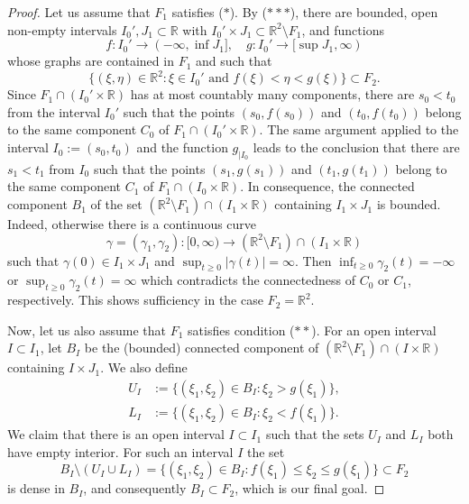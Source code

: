 \documentclass[a4paper,10pt]{amsart}
\newtheorem*{crucial lemma}{Lemma \ref{lem:nice polynomial2}}
\theoremstyle{definition}
\newcommand{\R}{\mathbb{R}}
\begin{document}
\begin{proof}
Let us assume that $F_1$ satisfies ($\ast$). By ($\ast\ast\ast$), there are bounded, open non-empty intervals $I_0',J_1\subset \R$ with $I_0'\times J_1\subset \R^2\setminus F_1$, and functions 
\[f\colon I_0'\to(-\infty,\inf J_1],\quad g\colon I_0'\to[\sup J_1,\infty)\] whose graphs are contained in $F_1$ and such that
\[\{(\xi,\eta)\in\R^2\colon \xi\in I_0' \text{ and } f(\xi)<\eta<g(\xi)\}\subset F_2.\]
Since $F_1\cap(I_0'\times \R)$ has at most countably many components, there are $s_0<t_0$ from the interval $I_0'$ such that the points $(s_0,f(s_0))$ and $(t_0,f(t_0))$ belong to the same component $C_0$ of $F_1\cap(I_0'\times \R)$. The same argument applied to the interval $I_0:=(s_0,t_0)$ and the function $g_{\mid{I_0}}$ leads to the conclusion that there are $s_1<t_1$ from $I_0$ such that the points $(s_1,g(s_1))$ and $(t_1,g(t_1))$ belong to the same component $C_1$ of $F_1\cap(I_0\times\R)$. In consequence, the connected component $B_1$ of the set $(\R^2\setminus F_1)\cap(I_1\times \R)$ containing $I_1\times J_1$ is bounded. Indeed, otherwise there is a continuous curve 
\[\gamma=(\gamma_1,\gamma_2)\colon[0,\infty)\to (\R^2\setminus F_1)\cap (I_1\times\R)\]
such that $\gamma(0)\in I_1\times J_1$ and $\sup_{t\geq0}|\gamma(t)|=\infty$. Then $\inf_{t\geq0}\gamma_2(t)=-\infty$ or $\sup_{t\geq0}\gamma_2(t)=\infty$ which contradicts the connectedness of $C_0$ or $C_1$, respectively.
This shows sufficiency in the case $F_2=\R^2$. 

Now, let us also assume that $F_1$ satisfies condition ($\ast\ast$).
For an open interval $I\subset I_1$, let $B_I$ be the (bounded) connected component of $(\R^2\setminus F_1)\cap (I\times\R)$ containing $I\times J_1$. We also define
\begin{align*}
U_I&:=\{(\xi_1,\xi_2)\in B_I\colon \xi_2>g(\xi_1)\},\\
L_I&:=\{(\xi_1,\xi_2)\in B_I\colon \xi_2<f(\xi_1)\}.
\end{align*}
We claim that there is an open interval $I\subset I_1$ such that the sets $U_I$ and $L_I$ both have empty interior. For such an interval $I$ the set
\[B_I\setminus(U_I\cup L_I)=\{(\xi_1,\xi_2)\in B_I\colon f(\xi_1)\leq \xi_2\leq g(\xi_1)\}\subset F_2\]
is dense in $B_I$, and consequently $B_I\subset F_2$, which is our final goal.


\end{proof}
\end{document}
